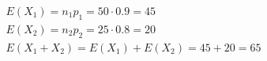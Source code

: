 \item

\[\begin{array}{l}
E(X_1) = n_1p_1 = 50 \cdot 0.9 = 45\\
E(X_2) = n_2p_2 = 25 \cdot 0.8 = 20\\
E(X_1 + X_2) = E(X_1) + E(X_2) = 45 + 20 = 65
\end{array}\]
